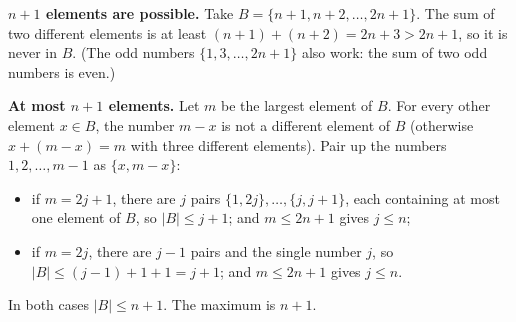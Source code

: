 \textbf{$n+1$ elements are possible.} Take $B=\{n+1,n+2,\ldots,2n+1\}$. The sum of two different elements is at least $(n+1)+(n+2)=2n+3>2n+1$, so it is never in $B$. (The odd numbers $\{1,3,\ldots,2n+1\}$ also work: the sum of two odd numbers is even.)

\textbf{At most $n+1$ elements.} Let $m$ be the largest element of $B$. For every other element $x\in B$, the number $m-x$ is not a different element of $B$ (otherwise $x+(m-x)=m$ with three different elements). Pair up the numbers $1,2,\ldots,m-1$ as $\{x,m-x\}$:
\begin{itemize}
\item if $m=2j+1$, there are $j$ pairs $\{1,2j\},\ldots,\{j,j+1\}$, each containing at most one element of $B$, so $|B|\le j+1$; and $m\le2n+1$ gives $j\le n$;
\item if $m=2j$, there are $j-1$ pairs and the single number $j$, so $|B|\le(j-1)+1+1=j+1$; and $m\le2n+1$ gives $j\le n$.
\end{itemize}
In both cases $|B|\le n+1$. The maximum is $\boxed{n+1}$.
